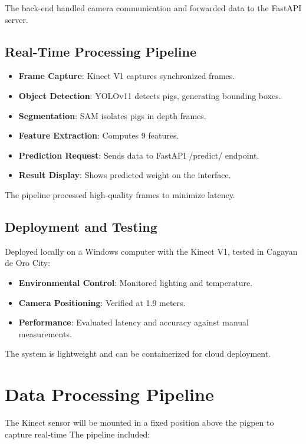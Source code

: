 {The back-end handled camera communication and forwarded data to the FastAPI server.

\subsection{Real-Time Processing Pipeline}

\begin{itemize}
	\item \textbf{Frame Capture}: Kinect V1 captures synchronized frames.
	\item \textbf{Object Detection}: YOLOv11 detects pigs, generating bounding boxes.
	\item \textbf{Segmentation}: SAM isolates pigs in depth frames.
	\item \textbf{Feature Extraction}: Computes 9 features.
	\item \textbf{Prediction Request}: Sends data to FastAPI /predict/ endpoint.
	\item \textbf{Result Display}: Shows predicted weight on the interface.
\end{itemize}

The pipeline processed high-quality frames to minimize latency.

\subsection{Deployment and Testing}

Deployed locally on a Windows computer with the Kinect V1, tested in Cagayan de Oro City:

\begin{itemize}
	\item \textbf{Environmental Control}: Monitored lighting and temperature.
	\item \textbf{Camera Positioning}: Verified at 1.9 meters.
	\item \textbf{Performance}: Evaluated latency and accuracy against manual measurements.
\end{itemize}

The system is lightweight and can be containerized for cloud deployment.

\section{Data Processing Pipeline}

The Kinect sensor will be mounted in a fixed position above the pigpen to capture real-time The pipeline included:

}
